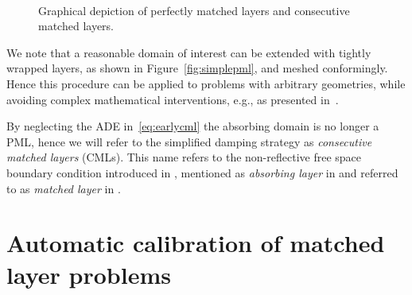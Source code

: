 \documentclass[a4paper]{article}
\begin{document}
\begin{figure}
  \centering
  \hfill
  \\
  \hfill
  \caption{Graphical depiction of perfectly matched layers and
    consecutive matched layers.}
\end{figure}

We note that a reasonable domain of interest can be extended with
tightly wrapped layers, as shown in Figure~\ref{fig:simplepml}, and
meshed conformingly. Hence this procedure can be applied to problems
with arbitrary geometries, while avoiding complex mathematical
interventions, e.g., as presented in~\citep{gao08zhang}.

By neglecting the ADE in~\eqref{eq:earlycml} the absorbing domain is
no longer a PML, hence we will refer to the simplified damping
strategy as \emph{consecutive matched layers} (CMLs). This name refers
to the non-reflective free space boundary condition introduced in
\citet{katz76etall}, mentioned as \emph{absorbing layer} in
\citet{holland83williams} and referred to as \emph{matched layer} in
\citet{berenger94}.

\section{Automatic calibration of matched layer problems}
\label{sec:setup}
\end{document}
